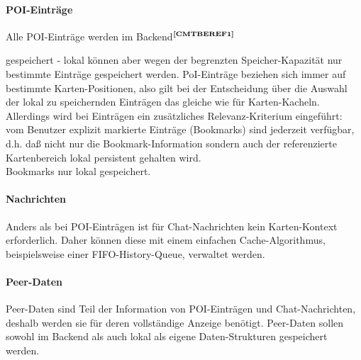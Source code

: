 \paragraph{POI-Einträge}
Alle POI-Einträge werden im Backend$^{\textbf{\ref{CMTBEREF1}}}$%
\addtocounter{footnote}{1}%
 gespeichert - lokal können aber wegen der begrenzten Speicher-Kapazität nur bestimmte Einträge gespeichert werden. PoI-Einträge beziehen sich immer auf bestimmte Karten-Positionen, also gilt bei der Entscheidung über die Auswahl der lokal zu speichernden Einträgen das gleiche wie für Karten-Kacheln.\\
Allerdings wird bei Einträgen ein zusätzliches Relevanz-Kriterium eingeführt: vom Benutzer explizit markierte Einträge (Bookmarks) sind jederzeit verfügbar, d.h. daß nicht nur die Bookmark-Information sondern auch der referenzierte Kartenbereich lokal persistent gehalten wird. \\
Bookmarks nur lokal gespeichert.





\paragraph{Nachrichten}
Anders als bei POI-Einträgen ist für Chat-Nachrichten kein Karten-Kontext erforderlich. Daher können
diese mit einem einfachen Cache-Algorithmus, beispielsweise einer FIFO-History-Queue, verwaltet werden.

\paragraph{Peer-Daten}
Peer-Daten sind Teil der Information von POI-Einträgen und Chat-Nachrichten, deshalb werden sie für deren vollständige Anzeige benötigt. Peer-Daten sollen sowohl im Backend als auch lokal als eigene Daten-Strukturen gespeichert werden.

